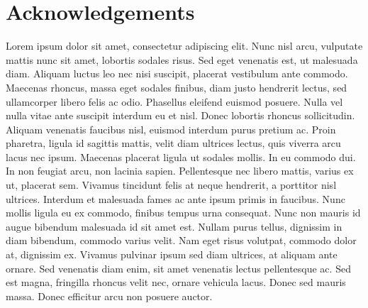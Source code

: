 \chapter*{Acknowledgements}

Lorem ipsum dolor sit amet, consectetur adipiscing elit. Nunc nisl arcu, vulputate mattis nunc sit amet, lobortis sodales risus. Sed eget venenatis est, ut malesuada diam. Aliquam luctus leo nec nisi suscipit, placerat vestibulum ante commodo. Maecenas rhoncus, massa eget sodales finibus, diam justo hendrerit lectus, sed ullamcorper libero felis ac odio. Phasellus eleifend euismod posuere. Nulla vel nulla vitae ante suscipit interdum eu et nisl. Donec lobortis rhoncus sollicitudin. Aliquam venenatis faucibus nisl, euismod interdum purus pretium ac. Proin pharetra, ligula id sagittis mattis, velit diam ultrices lectus, quis viverra arcu lacus nec ipsum. Maecenas placerat ligula ut sodales mollis. In eu commodo dui. In non feugiat arcu, non lacinia sapien. Pellentesque nec libero mattis, varius ex ut, placerat sem. Vivamus tincidunt felis at neque hendrerit, a porttitor nisl ultrices. Interdum et malesuada fames ac ante ipsum primis in faucibus. Nunc mollis ligula eu ex commodo, finibus tempus urna consequat. Nunc non mauris id augue bibendum malesuada id sit amet est. Nullam purus tellus, dignissim in diam bibendum, commodo varius velit. Nam eget risus volutpat, commodo dolor at, dignissim ex. Vivamus pulvinar ipsum sed diam ultrices, at aliquam ante ornare. Sed venenatis diam enim, sit amet venenatis lectus pellentesque ac. Sed est magna, fringilla rhoncus velit nec, ornare vehicula lacus. Donec sed mauris massa. Donec efficitur arcu non posuere auctor.

\clearpage